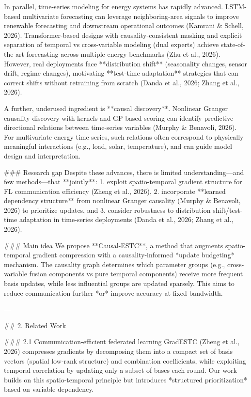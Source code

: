 In parallel, time-series modeling for energy systems has rapidly advanced. LSTM-based multivariate forecasting can leverage neighboring-area signals to improve renewable forecasting and downstream operational outcomes (Kamrani & Schell, 2026). Transformer-based designs with causality-consistent masking and explicit separation of temporal vs cross-variable modeling (dual experts) achieve state-of-the-art forecasting across multiple energy benchmarks (Zhu et al., 2026). However, real deployments face **distribution shift** (seasonality changes, sensor drift, regime changes), motivating **test-time adaptation** strategies that can correct shifts without retraining from scratch (Danda et al., 2026; Zhang et al., 2026).

A further, underused ingredient is **causal discovery**. Nonlinear Granger causality discovery with kernels and GP-based scoring can identify predictive directional relations between time-series variables (Murphy & Benavoli, 2026). For multivariate energy time series, such relations often correspond to physically meaningful interactions (e.g., load, solar, temperature), and can guide model design and interpretation.

### Research gap  
Despite these advances, there is limited understanding—and few methods—that **jointly**:
1. exploit spatio-temporal gradient structure for FL communication efficiency (Zheng et al., 2026),  
2. incorporate **learned dependency structure** from nonlinear Granger causality (Murphy & Benavoli, 2026) to prioritize updates, and  
3. consider robustness to distribution shift/test-time adaptation in time-series deployments (Danda et al., 2026; Zhang et al., 2026).

### Main idea  
We propose **Causal-ESTC**, a method that augments spatio-temporal gradient compression with a causality-informed *update budgeting* mechanism. The causality graph determines which parameter groups (e.g., cross-variable fusion components vs pure temporal components) receive more frequent basis updates, while less influential groups are updated sparsely. This aims to reduce communication further *or* improve accuracy at fixed bandwidth.

---

## 2. Related Work  

### 2.1 Communication-efficient federated learning  
GradESTC (Zheng et al., 2026) compresses gradients by decomposing them into a compact set of basis vectors (spatial low-rank structure) and combination coefficients, while exploiting temporal correlation by updating only a subset of bases each round. Our work builds on this spatio-temporal principle but introduces *structured prioritization* based on variable dependency.

